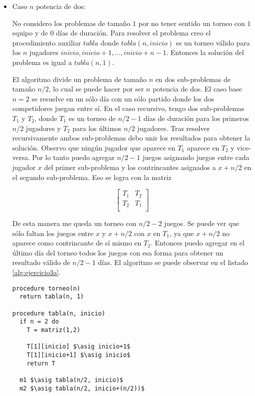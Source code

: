 \documentclass{article}
\newcommand{\asig}{\ensuremath{\leftarrow}}
\begin{document}
\begin{itemize}

\item Caso $n$ potencia de dos:

No considero los problemas de tamaño $1$ por no tener sentido un torneo con $1$ equipo y de $0$
días de duración. Para resolver el problema creo el procedimiento auxiliar $tabla$ donde
$tabla(n, inicio)$ es un torneo válido para los $n$ jugadores $inicio, inicio+1, ..., inicio+n-1$.
Entonces la solución del problema es igual a $tabla(n, 1)$.

El algoritmo divide un problema de tamaño $n$ en dos sub-problemas
de tamaño $n/2$, lo cual se puede hacer por ser $n$ potencia de dos. El caso base $n = 2$
se resuelve en un sólo día con un sólo partido donde los dos competidores juegan entre sí.
En el caso recursivo, tengo dos sub-problemas $T_1$ y $T_2$, donde $T_1$ es un torneo de $n/2-1$ días
de duración para los primeros $n/2$ jugadores y $T_2$ para los últimos $n/2$ jugadores. Tras resolver
recursivamente ambos sub-problemas debo unir los resultados para obtener la solución. Observo que ningún
jugador que aparece en $T_1$ aparece en $T_2$ y vice-versa. Por lo tanto puedo agregar $n/2-1$ juegos
asignando juegos entre cada jugador $x$ del primer sub-problema y los contrincantes asignados a $x+n/2$
en el segundo sub-problema. Eso se logra con la matriz

$$
\left[
\begin{array}{cc}
T_1 & T_2 \\
T_2 & T_1 \\
\end{array}
\right]
$$

De esta manera me queda un torneo con $n/2-2$ juegos. Se puede ver que sólo faltan los juegos
entre $x$ y $x+n/2$ con $x$ en $T_1$, ya que $x+n/2$ no aparece como contrincante de sí mismo
en $T_2$. Entonces puedo agregar en el último día del torneo todos los juegos con esa forma para
obtener un resultado válido de $n/2-1$ días. El algoritmo se puede observar en el listado
\ref{alg:ejercicio3a}.

\begin{lstlisting}[float,caption={Solución al ejercicio 3},label=alg:ejercicio3a]
procedure torneo(n)
  return tabla(n, 1)

procedure tabla(n, inicio)
  if n = 2 do
    T = matriz(1,2)

    T[1][inicio] $\asig inicio+1$
    T[1][inicio+1] $\asig inicio$
    return T

  m1 $\asig tabla(n/2, inicio)$
  m2 $\asig tabla(n/2, inicio+(n/2))$


\end{lstlisting}
\end{itemize}
\end{document}
